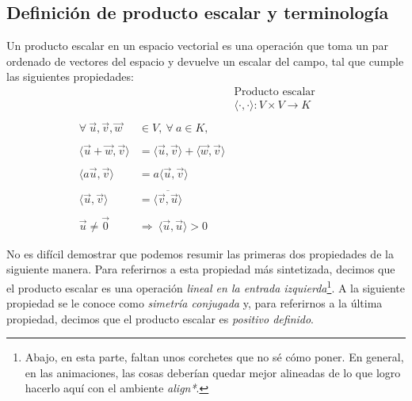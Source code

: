 \documentclass[12pt,dvipsnames]{article}
\numberwithin{equation}{section}
\begin{document}
\subsection{Definición de producto escalar y terminología}

Un producto escalar en un espacio vectorial es una operación que toma un par ordenado de vectores del espacio y devuelve un escalar del campo, tal que cumple las siguientes propiedades:
\begin{align*}
    & &\text{Producto escalar}& &\\
    & &\langle\cdot,\cdot\rangle:V\times V\to K & &\\
    \\
    \forall \ \vec{u}, \vec{v}, \vec{w}&\in V, \ \forall \ a\in K,\\
    \\
    \langle\vec{u}+\vec{w},\vec{v}\rangle &= \langle \vec{u} , \vec{v} \rangle + \langle \vec{w} , \vec{v} \rangle \\
    \\
    \langle a\vec{u} , \vec{v} \rangle &= a \langle \vec{u} , \vec{v} \rangle\\
    \\
    \langle \vec{u} , \vec{v} \rangle &= \overline{ \langle \vec{v} , \vec{u} \rangle}\\
    \\
    \vec{u}\neq\vec{0} \ &\Rightarrow \ \langle \vec{u}, \vec{u} \rangle > 0
\end{align*}

\noindent No es difícil demostrar que podemos resumir las primeras dos propiedades de la siguiente manera. Para referirnos a esta propiedad más sintetizada, decimos que el producto escalar es una operación \emph{lineal en la entrada izquierda}\footnote{Abajo, en esta parte, faltan unos corchetes que no sé cómo poner. En general, en las animaciones, las cosas deberían quedar mejor alineadas de lo que logro hacerlo aquí con el ambiente \emph{align*}.}. A la siguiente propiedad se le conoce como \emph{simetría conjugada} y, para referirnos a la última propiedad, decimos que el producto escalar es \emph{positivo definido}.
\end{document}
